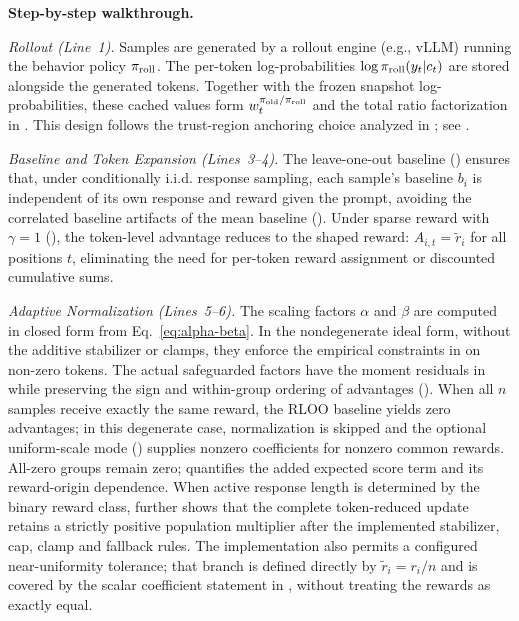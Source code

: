 \textbf{Step-by-step walkthrough.}

\emph{Rollout (Line~1).} Samples are generated by a rollout engine (e.g., vLLM)
running the behavior policy $\pi_{\mathrm{roll}}$. The per-token log-probabilities
$\log\pi_{\mathrm{roll}}(y_t|c_t)$ are stored alongside the generated tokens. Together
with the frozen snapshot log-probabilities, these cached values form
$w_t^{\pi_{\mathrm{old}}/\pi_{\mathrm{roll}}}$ and the total ratio factorization in
. This design follows the trust-region anchoring
choice analyzed in \citet{qi2026rethinkingtrustregionllm}; see
.

\emph{Baseline and Token Expansion (Lines~3--4).} The leave-one-out baseline () ensures that, under conditionally i.i.d. response sampling, each sample's baseline $b_i$ is independent of its own response and reward given the prompt, avoiding the correlated baseline artifacts of the mean baseline (). Under sparse reward with $\gamma = 1$ (), the token-level advantage reduces to the shaped reward: $A_{i,t} = \tilde{r}_i$ for all positions $t$, eliminating the need for per-token reward assignment or discounted cumulative sums.

\emph{Adaptive Normalization (Lines~5--6).} The scaling factors $\alpha$ and $\beta$ are computed in closed form from
Eq.~\eqref{eq:alpha-beta}. In the nondegenerate ideal form, without the additive stabilizer or clamps, they enforce the empirical constraints in
 on non-zero tokens. The actual safeguarded factors have the moment residuals in
 while preserving the sign and within-group ordering of advantages
(). When all $n$ samples receive exactly the same
reward, the RLOO baseline yields zero advantages; in this degenerate case,
normalization is skipped and the optional uniform-scale mode
() supplies nonzero coefficients for nonzero
common rewards. All-zero groups remain zero; 
quantifies the added expected score term and its reward-origin dependence.
When active response length is determined by the binary reward class,
 further shows that the complete
token-reduced update retains a strictly positive population multiplier after
the implemented stabilizer, cap, clamp and fallback rules.
The implementation also
permits a configured near-uniformity tolerance; that branch is defined directly by
$\tilde r_i=r_i/n$ and is covered by the scalar coefficient statement in
, without treating the rewards as exactly equal.

